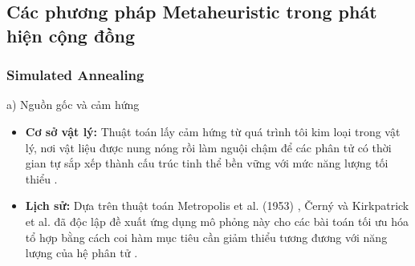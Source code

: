 \documentclass[14pt,a4paper]{extarticle}
\begin{document}
\subsection{Các phương pháp Metaheuristic trong phát hiện cộng đồng}

\subsubsection{Simulated Annealing}

\noindent a) Nguồn gốc và cảm hứng
\begin{itemize}
    \item \textbf{Cơ sở vật lý:} Thuật toán lấy cảm hứng từ quá trình tôi kim loại trong vật lý, nơi vật liệu được nung nóng rồi làm nguội chậm để các phân tử có thời gian tự sắp xếp thành cấu trúc tinh thể bền vững với mức năng lượng tối thiểu \cite{Taillard2023, Luke2009}.
    \item \textbf{Lịch sử:} Dựa trên thuật toán Metropolis et al. (1953) \cite{Luke2009}, Černý và Kirkpatrick et al. đã độc lập đề xuất ứng dụng mô phỏng này cho các bài toán tối ưu hóa tổ hợp bằng cách coi hàm mục tiêu cần giảm thiểu tương đương với năng lượng của hệ phân tử \cite{Taillard2023}.
\end{itemize}
\end{document}
